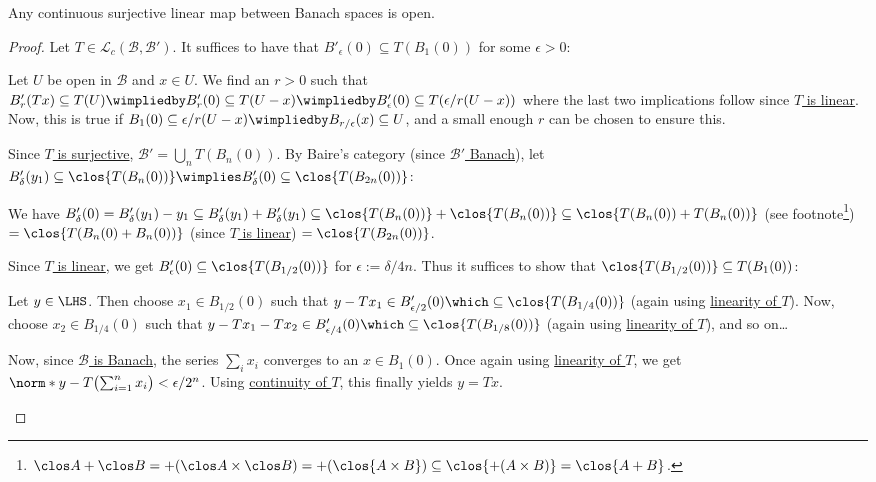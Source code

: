 	\begin{thm}
		Any continuous surjective linear map between Banach spaces is open.
	\end{thm}
	
	\begin{proof}
		Let $T\in\mathcal L_c(\mathscr B, \mathscr B')$. It suffices to have that $B'_\epsilon(0)\subseteq T(B_1(0))$ for some $\epsilon > 0$:
		\begin{subproof}
			Let $U$ be open in $\mathscr B$ and $x\in U$. We find an $r > 0$ such that $B'_r(Tx)\subseteq T(U)
			\wimpliedby B'_r(0)\subseteq T(U - x)
			\wimpliedby B'_\epsilon(0)\subseteq T(\epsilon/r(U - x))$
			where the last two implications follow since \uline{$T$ is linear}. Now, this is true if $B_1(0)\subseteq \epsilon/r(U - x)
			\wimpliedby B_{r/\epsilon}(x)\subseteq U$, and a small enough $r$ can be chosen to ensure this.
		\end{subproof}
		
		Since \uline{$T$ is surjective}, $\mathscr B' = \bigcup_n T(B_n(0))$. By Baire's category (since \uline{$\mathscr B'$ Banach}), let $B'_\delta(y_1)\subseteq \clos{T(B_n(0))}\wimplies B'_\delta(0)\subseteq \clos{T(B_{2n}(0))}$:
		\begin{subproof}
			We have $B'_\delta(0) = B'_\delta(y_1) - y_1
			\subseteq B'_\delta(y_1) + B'_\delta(y_1)
			\subseteq \clos{T(B_n(0))} + \clos{T(B_n(0))}
			\subseteq \clos{T(B_n(0)) + T(B_n(0))}$ (see footnote\footnote{$\clos A + \clos B 
						= +(\clos A\times\clos B)
						= +(\clos{A\times B})
						\subseteq \clos{+(A\times B)}
						= \clos{A + B}$.})
			$= \clos{T(B_n(0) + B_n(0))}$ (since \uline{$T$ is linear})
			$= \clos{T(B_{2n}(0))}$.
		\end{subproof}
		
		Since \uline{$T$ is linear}, we get $B'_{\epsilon}(0)\subseteq\clos{T(B_{1/2}(0))}$ for $\epsilon := \delta/4n$. Thus it suffices to show that $\clos{T(B_{1/2}(0))}\subseteq T(B_1(0))$:
		\begin{subproof}
			Let $y\in\LHS$. Then choose $x_1\in B_{1/2}(0)$ such that $y - Tx_1\in B'_{\epsilon/2}(0)\which\subseteq\clos{T(B_{1/4}(0))}$ (again using \uline{linearity of $T$}). Now, choose $x_2\in B_{1/4}(0)$ such that $y - Tx_1 - Tx_2\in B'_{\epsilon/4}(0)\which\subseteq\clos{T(B_{1/8}(0))}$ (again using \uline{linearity of $T$}), and so on\ldots{}
			
			Now, since \uline{$\mathscr B$ is Banach}, the series $\sum_i x_i$ converges to an $x\in B_1(0)$. Once again using \uline{linearity of $T$}, we get $\norm*{y - T\bigl(\sum_{i = 1}^n x_i\bigr)} < \epsilon/2^n$. Using \uline{continuity of $T$}, this finally yields $y = Tx$.\qedhere
		\end{subproof}
	\end{proof}
	
